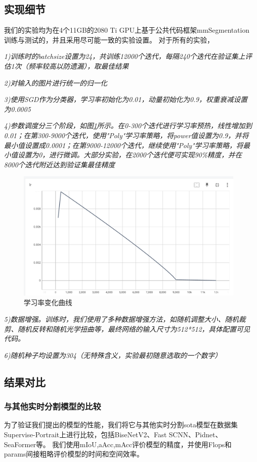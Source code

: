 \documentclass[11pt]{article}
\begin{document}
\subsection{实现细节}
我们的实验均为在4个11GB的2080 Ti GPU上基于公共代码框架mmSegmentation训练与测试的，并且采用尽可能一致的实验设置。
对于所有的实验，

\textit{1)训练时的batchsize设置为24，共训练12000个迭代，每隔240个迭代在验证集上评估1次（频率较高以防遗漏），取最佳结果}

\textit{2)对输入的图片进行统一的归一化}

\textit{3)使用SGD作为分类器，学习率初始化为0.01，动量初始化为0.9，权重衰减设置为0.0005}

\textit{4)参数调度分三个阶段，如图\ref{fig:7}所示。在0-300个迭代进行学习率预热，线性增加到0.01；在第300-9000个迭代，使用"Poly"学习率策略，将power值设置为0.9，并将最小值设置成0.0001；在第9000-12000个迭代，继续使用"Poly"学习率策略，将最小值设置为0，进行微调。大部分实验，在2000个迭代便可实现90\%精度，并在8000个迭代附近达到验证集最佳精度}

\begin{figure}[!ht]
  \centering
  \includegraphics[width=12cm]{lr.png}

  \centering
  \caption{学习率变化曲线}
  \label{fig:7}
\end{figure}

\textit{5)数据增强。训练时，我们使用了多种数据增强方法，如随机调整大小、随机裁剪、随机反转和随机光学扭曲等，最终网络的输入尺寸为512*512，具体配置可见代码。}

\textit{6)随机种子均设置为304（无特殊含义，实验最初随意选取的一个数字）}

\subsection{结果对比}
\subsubsection{与其他实时分割模型的比较}
为了验证我们提出的模型的性能，我们将它与其他实时分割sota模型在数据集Supervise-Portrait上进行比较，包括BiseNetV2、Fast SCNN、Pidnet、SeaFormer等。
我们使用mIoU,aAcc,mAcc评价模型的精度，并使用Flops和params间接粗略评价模型的时间和空间效率。
\end{document}
